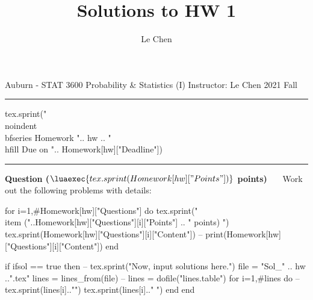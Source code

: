 \documentclass[a4paper,12pt]{article}
\title{Solutions to HW 1}
\author{Le Chen}
\newenvironment{question}[1][] %
  {\begin{mdframed}[backgroundcolor=lightgray]\textbf{Question #1}~~~\noindent}%
  {\end{mdframed}}
\begin{document}
\noindent Auburn - STAT 3600 \hfill Probability \& Statistics (I) \newline
\noindent Instructor: Le Chen \hfill 2021 Fall\newline
\hrule
\vspace{5mm}
\begin{luacode}
    tex.sprint("\\noindent {\\bfseries Homework} ".. hw .. " \\hfill Due on ".. Homework[hw]["Deadline"])
\end{luacode}
\vspace{5mm}
\hrule
\noindent

\begin{question}[($\luaexec{tex.sprint(Homework[hw]["Points"])}$ points)]
Work out the following problems with details:
\begin{enumerate}
    \begin{luacode}
	for i=1,#Homework[hw]["Questions"] do
	    tex.sprint("\\item ("..Homework[hw]["Questions"][i]["Points"] .. " points) ")
	    tex.sprint(Homework[hw]["Questions"][i]["Content"])
	    -- print(Homework[hw]["Questions"][i]["Content"])
	end
    \end{luacode}
\end{enumerate}
\end{question}

\begin{luacode}
   if ifsol == true then
	-- tex.sprint("Now, input solutions here.")
	file = "Sol_" .. hw ..".tex"
	lines = lines_from(file)
	-- lines = dofile("lines.table")
	for i=1,#lines do
	    -- tex.sprint(lines[i].."\string\n")
	    tex.sprint(lines[i].." ")
	end
   end
\end{luacode}
\end{document}
